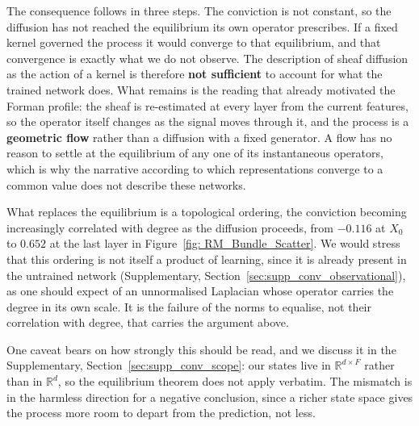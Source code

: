 The consequence follows in three steps. The conviction is not constant, so the
diffusion has not reached the equilibrium its own operator prescribes. If a
fixed kernel governed the process it would converge to that equilibrium, and
that convergence is exactly what we do not observe.
The description of sheaf diffusion as the action of a kernel is therefore
\textbf{not sufficient} to account for what the trained network does. What
remains is the reading that already motivated the Forman profile: the sheaf is
re-estimated at every layer from the current features, so the operator itself
changes as the signal moves through it, and the process is a \textbf{geometric
flow} rather than a diffusion with a fixed generator. A flow has no reason to
settle at the equilibrium of any one of its instantaneous operators, which is
why the narrative according to which representations converge to a common value
does not describe these networks.

What replaces the equilibrium is a topological ordering, the conviction becoming
increasingly correlated with degree as the diffusion proceeds, from $-0.116$ at
$X_0$ to $0.652$ at the last layer in Figure~\ref{fig: RM_Bundle_Scatter}. We
would stress that this ordering is not itself a product of learning, since it is
already present in the untrained network (Supplementary,
Section~\ref{sec:supp_conv_observational}), as one should expect of an
unnormalised Laplacian whose operator carries the degree in its own scale. It is
the failure of the norms to equalise, not their correlation with degree, that
carries the argument above.

One caveat bears on how strongly this should be read, and we discuss it in the
Supplementary, Section~\ref{sec:supp_conv_scope}: our states live in
$\mathbb{R}^{d\times F}$ rather than in $\mathbb{R}^d$, so the equilibrium
theorem does not apply verbatim. The mismatch is in the harmless direction for a
negative conclusion, since a richer state space gives the process more room to
depart from the prediction, not less.

